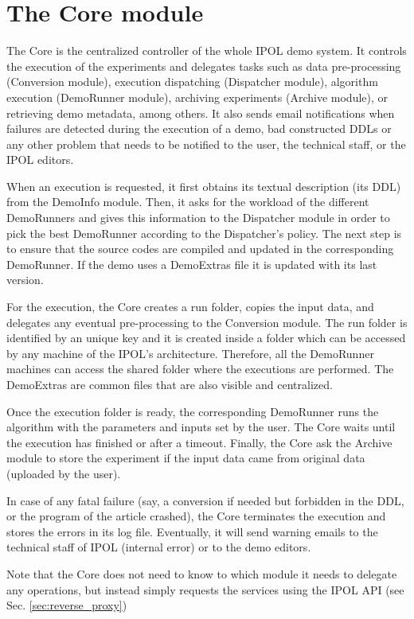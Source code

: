\section{The Core module}
The Core is the centralized controller of the whole IPOL demo system. It controls the execution of the experiments and delegates tasks such as data pre-processing (Conversion module), execution dispatching (Dispatcher module), algorithm execution (DemoRunner module), archiving experiments (Archive module), or retrieving demo metadata, among others. It also sends email notifications when failures are detected during the execution of a demo, bad constructed DDLs or any other problem that needs to be notified to the user, the technical staff, or the IPOL editors.

When an execution is requested, it first obtains its textual description (its DDL) from the DemoInfo module. Then, it asks for the workload of the different DemoRunners and gives this information to the Dispatcher module in order to pick the best DemoRunner according to the Dispatcher's policy. The next step is to ensure that the source codes are compiled and updated in the corresponding DemoRunner. If the demo uses a DemoExtras file it is updated with its last version.

For the execution, the Core creates a run folder, copies the input data, and delegates any eventual pre-processing to the Conversion module. The run folder is identified by an unique key and it is created inside a folder which can be accessed by any machine of the IPOL's architecture. Therefore, all the DemoRunner machines can access the shared folder where the executions are performed. The DemoExtras are common files that are also visible and centralized.

Once the execution folder is ready, the corresponding DemoRunner runs the algorithm with the parameters and inputs set by the user. The Core waits until the execution has finished or after a timeout. Finally, the Core ask the Archive module to store the experiment if the input data came from original data (uploaded by the user).

In case of any fatal failure (say, a conversion if needed but forbidden in the DDL, or the program of the article crashed), the Core terminates the execution and stores the errors in its log file. Eventually, it will send warning emails to the technical staff of IPOL (internal error) or to the demo editors.

Note that the Core does not need to know to which module it needs to delegate any operations, but instead simply requests the services using the IPOL API (see Sec. \ref{sec:reverse_proxy})

